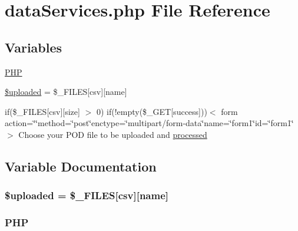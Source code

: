 \hypertarget{data_services_8php}{}\section{data\+Services.\+php File Reference}
\label{data_services_8php}
\subsection*{Variables}
\begin{DoxyCompactItemize}
\item 
\hyperlink{data_services_8php_add1bb3a6ddd16413aa3c25c7002833e7}{P\+HP}
\item 
\hyperlink{data_services_8php_a5e92bb37ab892f2f238ed28c5c2c40d2}{\$uploaded} = \$\+\_\+\+F\+I\+L\+ES\mbox{[}\textquotesingle{}csv\textquotesingle{}\mbox{]}\mbox{[}\textquotesingle{}name\textquotesingle{}\mbox{]}
\item 
if(\$\+\_\+\+F\+I\+L\+ES\mbox{[}csv\mbox{]}\mbox{[}size\mbox{]} $>$ 0) if(!empty(\$\+\_\+\+G\+ET\mbox{[}success\mbox{]}))$<$ form action=\char`\"{}\char`\"{}method=\char`\"{}post\char`\"{}enctype=\char`\"{}multipart/form-\/data\char`\"{}name=\char`\"{}form1\char`\"{}id=\char`\"{}form1\char`\"{}$>$ Choose your P\+OD file to be uploaded and \hyperlink{data_services_8php_a933f9857f8ebf67bd680066a512f38ba}{processed}
\end{DoxyCompactItemize}


\subsection{Variable Documentation}
\subsubsection[{\texorpdfstring{\$uploaded}{$uploaded}}]{\setlength{\rightskip}{0pt plus 5cm}\$uploaded = \$\+\_\+\+F\+I\+L\+ES\mbox{[}\textquotesingle{}csv\textquotesingle{}\mbox{]}\mbox{[}\textquotesingle{}name\textquotesingle{}\mbox{]}}\hypertarget{data_services_8php_a5e92bb37ab892f2f238ed28c5c2c40d2}{}\label{data_services_8php_a5e92bb37ab892f2f238ed28c5c2c40d2}
\subsubsection[{\texorpdfstring{P\+HP}{PHP}}]{\setlength{\rightskip}{0pt plus 5cm}P\+HP}\hypertarget{data_services_8php_add1bb3a6ddd16413aa3c25c7002833e7}{}\label{data_services_8php_add1bb3a6ddd16413aa3c25c7002833e7}
